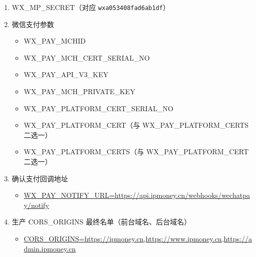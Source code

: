 ﻿\documentclass[12pt]{ctexart}
\begin{document}
\begin{enumerate}
  \item WX\_MP\_SECRET（对应 \texttt{wxa053408fad6ab1df}）
  \item 微信支付参数
  \begin{itemize}
    \item WX\_PAY\_MCHID
    \item WX\_PAY\_MCH\_CERT\_SERIAL\_NO
    \item WX\_PAY\_API\_V3\_KEY
    \item WX\_PAY\_MCH\_PRIVATE\_KEY
    \item WX\_PAY\_PLATFORM\_CERT\_SERIAL\_NO
    \item WX\_PAY\_PLATFORM\_CERT（与 WX\_PAY\_PLATFORM\_CERTS 二选一）
    \item WX\_PAY\_PLATFORM\_CERTS（与 WX\_PAY\_PLATFORM\_CERT 二选一）
  \end{itemize}
  \item 确认支付回调地址
  \begin{itemize}
    \item \url{WX_PAY_NOTIFY_URL=https://api.ipmoney.cn/webhooks/wechatpay/notify}
  \end{itemize}
  \item 生产 CORS\_ORIGINS 最终名单（前台域名、后台域名）
  \begin{itemize}
    \item \url{CORS_ORIGINS=https://ipmoney.cn,https://www.ipmoney.cn,https://admin.ipmoney.cn}
  \end{itemize}
\end{enumerate}
\end{document}

